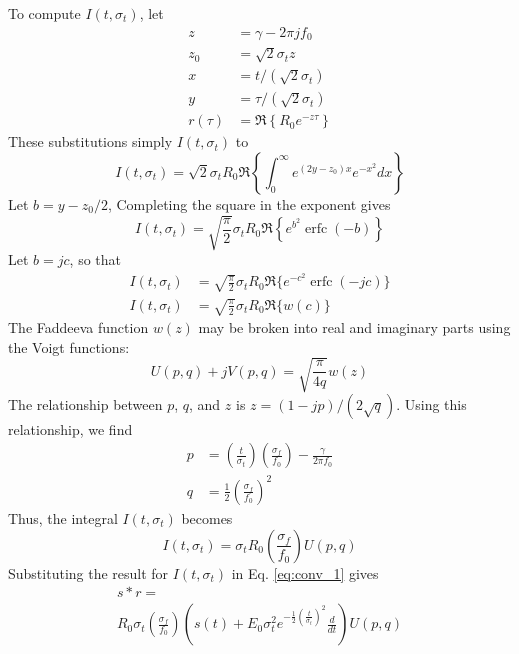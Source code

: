 \documentclass[amsmath,amssymb,aps,prd,10pt,twocolumn,showkeys]{revtex4}
\DeclareMathOperator\erfc{erfc}
\begin{document}
\begin{itemize}
To compute $I(t,\sigma_t)$, let
\begin{align}
z &= \gamma - 2\pi j f_0 \\
z_0 &= \sqrt{2}\sigma_t z\\
x &= t/(\sqrt{2} \sigma_t) \\
y &= \tau/(\sqrt{2} \sigma_t) \\
r(\tau) &= \Re\left\lbrace R_0 e^{-z\tau}\right\rbrace
\end{align}
These substitutions simply $I(t,\sigma_t)$ to
\begin{equation}
I(t,\sigma_t) = \sqrt{2} \sigma_t R_0 \Re \left\lbrace\int_0^{\infty} e^{(2y-z_0)x} e^{-x^2} dx \right\rbrace
\end{equation}
Let $b = y-z_0/2$, Completing the square in the exponent gives
\begin{equation}
I(t,\sigma_t) = \sqrt{\frac{\pi}{2}} \sigma_t R_0 \Re\left\lbrace e^{b^2} \erfc(-b) \right\rbrace
\end{equation}
Let $b = jc$, so that
\begin{align}
I(t,\sigma_t) &= \sqrt{\frac{\pi}{2}} \sigma_t R_0 \Re\lbrace e^{-c^2} \erfc(-jc) \rbrace \\
I(t,\sigma_t) &= \sqrt{\frac{\pi}{2}} \sigma_t R_0 \Re\lbrace w(c) \rbrace
\end{align}
The Faddeeva function $w(z)$ may be broken into real and imaginary parts using the Voigt functions:
\begin{equation}
U(p,q) + jV(p,q) = \sqrt{\frac{\pi}{4q}} w(z)
\end{equation}
The relationship between $p$, $q$, and $z$ is $z=(1-jp)/(2\sqrt{q})$.  Using this relationship, we find
\begin{align}
p &= \left(\frac{t}{\sigma_t}\right)\left(\frac{\sigma_f}{f_0}\right) - \frac{\gamma}{2\pi f_0} \\
q &= \frac{1}{2}\left(\frac{\sigma_f}{f_0}\right)^2
\end{align}
Thus, the integral $I(t,\sigma_t)$ becomes
\begin{equation}
I(t,\sigma_t) = \sigma_t R_0 \left(\frac{\sigma_f}{f_0}\right) U(p,q)
\end{equation}
Substituting the result for $I(t,\sigma_t)$ in Eq. \ref{eq:conv_1} gives
\begin{multline}
s * r = \\
 R_0\sigma_t \left(\frac{\sigma_f}{f_0}\right) \left(s(t) + E_0 \sigma_t^2 e^{-\frac{1}{2}\left(\frac{t}{\sigma_t}\right)^2} \frac{d}{dt} \right) U(p,q) \label{eq:conv_2}
\end{multline}

\end{itemize}
\end{document}

